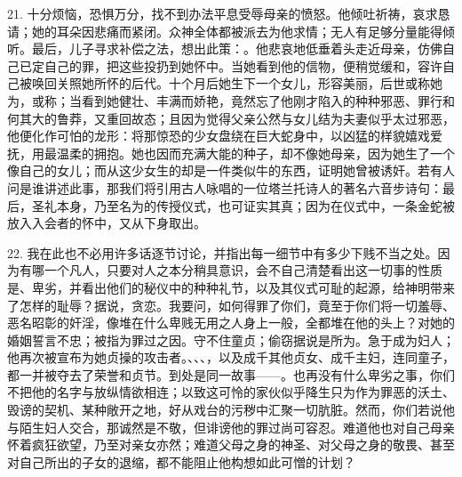 21. 十分烦恼，恐惧万分，找不到办法平息受辱母亲的愤怒。他倾吐祈祷，哀求恳请；她的耳朵因悲痛而紧闭。众神全体都被派去为他求情；无人有足够分量能得倾听。最后，儿子寻求补偿之法，想出此策：。他悲哀地低垂着头走近母亲，仿佛自己已定自己的罪，把这些投扔到她怀中。当她看到他的信物，便稍觉缓和，容许自己被唤回关照她所怀的后代。十个月后她生下一个女儿，形容美丽，后世或称她为，或称；当看到她健壮、丰满而娇艳，竟然忘了他刚才陷入的种种邪恶、罪行和何其大的鲁莽，又重回故态；且因为觉得父亲公然与女儿结为夫妻似乎太过邪恶，他便化作可怕的龙形：将那惊恐的少女盘绕在巨大蛇身中，以凶猛的样貌嬉戏爱抚，用最温柔的拥抱。她也因而充满大能的种子，却不像她母亲，因为她生了一个像自己的女儿；而从这少女生的却是一件类似牛的东西，证明她曾被诱奸。若有人问是谁讲述此事，那我们将引用古人咏唱的一位塔兰托诗人的著名六音步诗句：最后，圣礼本身，乃至名为的传授仪式，也可证实其真；因为在仪式中，一条金蛇被放入入会者的怀中，又从下身取出。\par

22. 我在此也不必用许多话逐节讨论，并指出每一细节中有多少下贱不当之处。因为有哪一个凡人，只要对人之本分稍具意识，会不自己清楚看出这一切事的性质是、卑劣，并看出他们的秘仪中的种种礼节，以及其仪式可耻的起源，给神明带来了怎样的耻辱？据说，贪恋。我要问，如何得罪了你们，竟至于你们将一切羞辱、恶名昭彰的奸淫，像堆在什么卑贱无用之人身上一般，全都堆在他的头上？对她的婚姻誓言不忠；被指为罪过之因。守不住童贞；偷窃据说是所为。急于成为妇人；他再次被宣布为她贞操的攻击者。、、、，以及成千其他贞女、成千主妇，连同童子，都一并被夺去了荣誉和贞节。到处是同一故事——。也再没有什么卑劣之事，你们不把他的名字与放纵情欲相连；以致这可怜的家伙似乎降生只为作为罪恶的沃土、毁谤的契机、某种敞开之地，好从戏台的污秽中汇聚一切肮脏。然而，你们若说他与陌生妇人交合，那诚然是不敬，但诽谤他的罪过尚可容忍。难道他也对自己母亲怀着疯狂欲望，乃至对亲女亦然；难道父母之身的神圣、对父母之身的敬畏、甚至对自己所出的子女的退缩，都不能阻止他构想如此可憎的计划？\par

